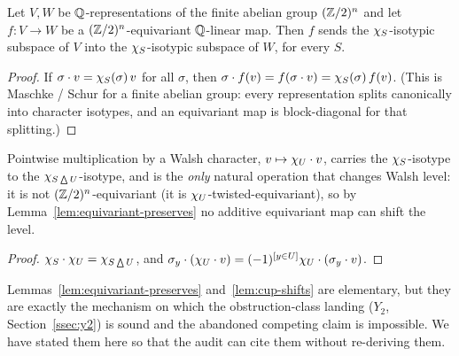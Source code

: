 \begin{lemma}
\label{lem:equivariant-preserves}
Let $V,W$ be $\mathbb{Q}$-representations of the finite abelian group
$(\mathbb{Z}/2)^n$ and let $f\colon V\to W$ be a $(\mathbb{Z}/2)^n$-equivariant
$\mathbb{Q}$-linear map. Then $f$ sends the $\chi_{S}$-isotypic subspace of $V$
into the $\chi_{S}$-isotypic subspace of $W$, for every $S$.
\end{lemma}

\begin{proof}
If $\sigma\cdot v=\chi_{S}(\sigma)\,v$ for all $\sigma$, then
$\sigma\cdot f(v)=f(\sigma\cdot v)=\chi_{S}(\sigma)\,f(v)$. (This is
Maschke / Schur for a finite abelian group: every representation
splits canonically into character isotypes, and an equivariant map is
block-diagonal for that splitting.)
\end{proof}

\begin{lemma}
\label{lem:cup-shifts}
Pointwise multiplication by a Walsh character, $v\mapsto\chi_{U}\cdot
v$, carries the $\chi_{S}$-isotype to the $\chi_{S\bigtriangleup
U}$-isotype, and is the \emph{only} natural operation that changes
Walsh level: it is not $(\mathbb{Z}/2)^n$-equivariant (it is $\chi_{U}$-twisted-equivariant), so by Lemma~\ref{lem:equivariant-preserves}
no additive equivariant map can shift the level.
\end{lemma}

\begin{proof}
$\chi_{S}\cdot\chi_{U}=\chi_{S\bigtriangleup U}$, and
$\sigma_y\cdot(\chi_{U}\cdot v)=(-1)^{[y\in U]}\chi_{U}\cdot(\sigma_y
\cdot v)$.
\end{proof}

Lemmas~\ref{lem:equivariant-preserves} and~\ref{lem:cup-shifts} are
elementary, but they are exactly the mechanism on which the
obstruction-class landing ($Y_2$, Section~\ref{ssec:y2}) is sound and
the abandoned competing claim is impossible. We have stated them here
so that the audit can cite them without re-deriving them.
